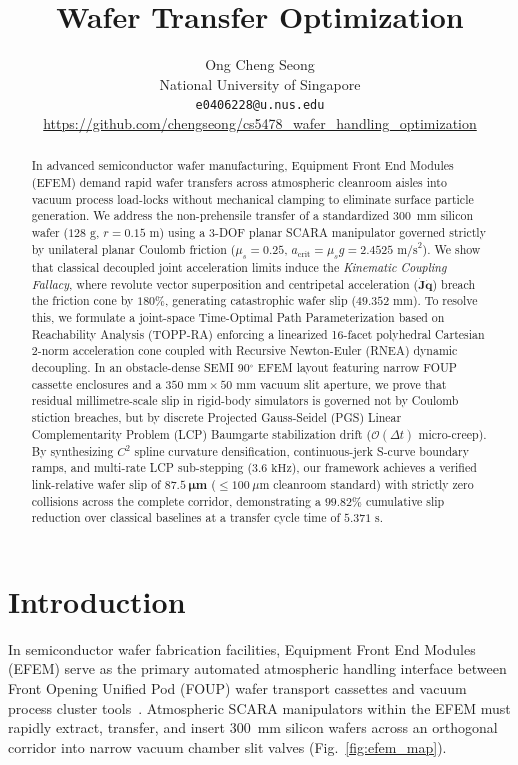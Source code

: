 \documentclass{article}
\title{Wafer Transfer Optimization}
\author{%
  Ong Cheng Seong \\
  National University of Singapore \\
  \texttt{e0406228@u.nus.edu} \\
  \url{https://github.com/chengseong/cs5478_wafer_handling_optimization}
}
\begin{document}
\maketitle

\begin{abstract}
In advanced semiconductor wafer manufacturing, Equipment Front End Modules (EFEM) demand rapid wafer transfers across atmospheric cleanroom aisles into vacuum process load-locks without mechanical clamping to eliminate surface particle generation. We address the non-prehensile transfer of a standardized 300~mm silicon wafer ($128\text{ g}$, $r=0.15\text{ m}$) using a 3-DOF planar SCARA manipulator governed strictly by unilateral planar Coulomb friction ($\mu_s = 0.25$, $a_{\text{crit}} = \mu_s g = 2.4525\text{ m/s}^2$). We show that classical decoupled joint acceleration limits induce the \textit{Kinematic Coupling Fallacy}, where revolute vector superposition and centripetal acceleration ($\dot{\mathbf{J}}\dot{\mathbf{q}}$) breach the friction cone by $180\%$, generating catastrophic wafer slip ($49.352\text{ mm}$). To resolve this, we formulate a joint-space Time-Optimal Path Parameterization based on Reachability Analysis (TOPP-RA) enforcing a linearized 16-facet polyhedral Cartesian 2-norm acceleration cone coupled with Recursive Newton-Euler (RNEA) dynamic decoupling. In an obstacle-dense SEMI 90$^\circ$ EFEM layout featuring narrow FOUP cassette enclosures and a $350\text{ mm} \times 50\text{ mm}$ vacuum slit aperture, we prove that residual millimetre-scale slip in rigid-body simulators is governed not by Coulomb stiction breaches, but by discrete Projected Gauss-Seidel (PGS) Linear Complementarity Problem (LCP) Baumgarte stabilization drift ($\mathcal{O}(\Delta t)$ micro-creep). By synthesizing $C^2$ spline curvature densification, continuous-jerk S-curve boundary ramps, and multi-rate LCP sub-stepping ($3.6\text{ kHz}$), our framework achieves a verified link-relative wafer slip of $\mathbf{87.5\ \mu\mathbf{m}}$ ($\le 100\ \mu\text{m}$ cleanroom standard) with strictly zero collisions across the complete corridor, demonstrating a $\mathbf{99.82\%}$ cumulative slip reduction over classical baselines at a transfer cycle time of $5.371\text{ s}$.
\end{abstract}

\section{Introduction}
In semiconductor wafer fabrication facilities, Equipment Front End Modules (EFEM) serve as the primary automated atmospheric handling interface between Front Opening Unified Pod (FOUP) wafer transport cassettes and vacuum process cluster tools~\cite{semi1999efem}. Atmospheric SCARA manipulators within the EFEM must rapidly extract, transfer, and insert 300~mm silicon wafers across an orthogonal corridor into narrow vacuum chamber slit valves (Fig.~\ref{fig:efem_map}). 
\end{document}

